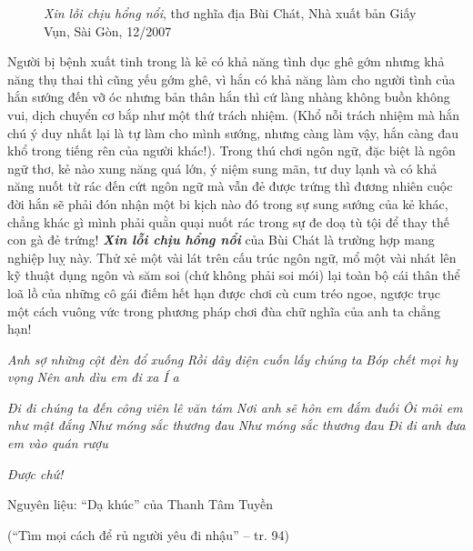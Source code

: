 \documentclass[../main.tex]{subfiles}
\begin{document}
\begin{multicols}{2}
\begin{figure}
	\caption{
\textit{Xin lỗi chịu hổng nổi}, thơ nghĩa địa Bùi Chát, Nhà xuất bản Giấy Vụn, Sài Gòn, 12/2007}
\end{figure}
Người bị bệnh xuất tinh trong là kẻ có khả năng tình dục ghê gớm nhưng khả năng thụ thai thì cũng yếu gớm ghê, vì hắn có khả năng làm cho người tình của hắn sướng đến vỡ óc nhưng bản thân hắn thì cứ làng nhàng không buồn không vui, dịch chuyển cơ bắp như một thứ trách nhiệm. (Khổ nỗi trách nhiệm mà hắn chú ý duy nhất lại là tự làm cho mình sướng, nhưng càng làm vậy, hắn càng đau khổ trong tiếng rên của người khác!). Trong thú chơi ngôn ngữ, đặc biệt là ngôn ngữ thơ, kẻ nào xung năng quá lớn, ý niệm sung mãn, tư duy lạnh và có khả năng nuốt từ rác đến cứt ngôn ngữ mà vẫn đẻ được trứng thì đương nhiên cuộc đời hắn sẽ phải đón nhận một bi kịch nào đó trong sự sung sướng của kẻ khác, chẳng khác gì mình phải quằn quại nuốt rác trong sự đe doạ tù tội để thay thế con gà đẻ trứng! \textit{\textbf{Xin lỗi chịu hổng nổi}} của Bùi Chát là trường hợp mang nghiệp luỵ này. Thử xẻ một vài lát trên cấu trúc ngôn ngữ, mổ một vài nhát lên kỹ thuật dụng ngôn và săm soi (chứ không phải soi mói) lại toàn bộ cái thân thể loã lồ của những cô gái điếm hết hạn được chơi cù cum tréo ngoe, ngược trục một cách vuông vức trong phương pháp chơi đùa chữ nghĩa của anh ta chẳng hạn! 
\begin{blockquote}


\textit{Anh sợ những cột đèn đổ xuống} 
\textit{Rồi dây điện cuốn lấy chúng ta} 
\textit{Bóp chết mọi hy vọng} 
\textit{Nên anh dìu em đi xa} 
\textit{Í a} 

\textit{Đi đi chúng ta đến công viên lê văn tám} 
\textit{Nơi anh sẽ hôn em đắm đuối} 
\textit{Ôi môi em như mật đắng} 
\textit{Như móng sắc thương đau} 
\textit{Như móng sắc thương đau} 
\textit{Đi đi anh đưa em vào quán rượu} 

\textit{Được chứ!} 

Nguyên liệu: “Dạ khúc” của Thanh Tâm Tuyền 

(“Tìm mọi cách để rủ người yêu đi nhậu” – tr. 94) 

\end{blockquote}



\end{multicols}
\end{document}
